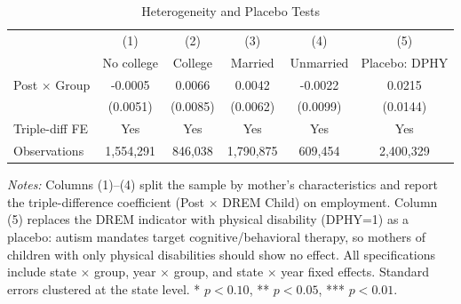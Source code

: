 \begin{table}[H]
\centering
\caption{Heterogeneity and Placebo Tests}
\begin{threeparttable}
\begin{tabular}{lccccc}
\toprule
 & (1) & (2) & (3) & (4) & (5) \\
 & No college & College & Married & Unmarried & Placebo: DPHY \\
\midrule
Post $\times$ Group & -0.0005 & 0.0066 & 0.0042 & -0.0022 & 0.0215 \\
 & (0.0051) & (0.0085) & (0.0062) & (0.0099) & (0.0144) \\
\midrule
Triple-diff FE & Yes & Yes & Yes & Yes & Yes \\
Observations & 1,554,291 & 846,038 & 1,790,875 & 609,454 & 2,400,329 \\
\bottomrule
\end{tabular}
\begin{tablenotes}[flushleft]
\small
\item \textit{Notes:} Columns (1)--(4) split the sample by mother's characteristics and report the triple-difference coefficient (Post $\times$ DREM Child) on employment. Column (5) replaces the DREM indicator with physical disability (DPHY=1) as a placebo: autism mandates target cognitive/behavioral therapy, so mothers of children with only physical disabilities should show no effect. All specifications include state $\times$ group, year $\times$ group, and state $\times$ year fixed effects. Standard errors clustered at the state level. * $p<0.10$, ** $p<0.05$, *** $p<0.01$.
\end{tablenotes}
\end{threeparttable}
\label{tab:hetero}
\end{table}

